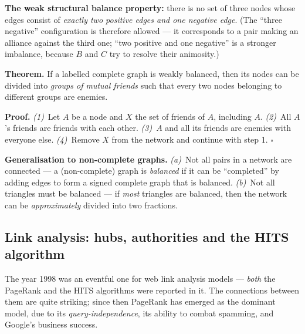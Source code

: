 \documentclass[11pt,a4paper]{article}
\theoremstyle{definition}
\providecommand{\uv}[1]{``#1''}
\begin{document}
\begin{defbox}
\textbf{The weak structural balance property:} there is no set of three nodes whose edges consist of
\emph{exactly two positive edges and one negative edge}. (The \uv{three negative} configuration is
therefore allowed --- it corresponds to a pair making an alliance against the third one; \uv{two
positive and one negative} is a stronger imbalance, because $B$ and $C$ try to resolve their
animosity.)

\textbf{Theorem.} If a labelled complete graph is weakly balanced, then its nodes can be divided into
\emph{groups of mutual friends} such that every two nodes belonging to different groups are enemies.

\textbf{Proof.} \emph{(1)}~Let $A$ be a node and $X$ the set of friends of $A$, including $A$.
\emph{(2)}~All $A$'s friends are friends with each other. \emph{(3)}~$A$ and all its friends are
enemies with everyone else. \emph{(4)}~Remove $X$ from the network and continue with step 1.
$\square$

\textbf{Generalisation to non-complete graphs.} \emph{(a)}~Not all pairs in a network are connected
--- a (non-complete) graph is \emph{balanced} if it can be \uv{completed} by adding edges to form a
signed complete graph that is balanced. \emph{(b)}~Not all triangles must be balanced --- if
\emph{most} triangles are balanced, then the network can be \emph{approximately} divided into two
fractions.
\end{defbox}

\subsection{Link analysis: hubs, authorities and the HITS algorithm}

The year 1998 was an eventful one for web link analysis models --- \emph{both} the PageRank and the
HITS algorithms were reported in it. The connections between them are quite striking; since then
PageRank has emerged as the dominant model, due to its \emph{query-independence}, its ability to
combat spamming, and Google's business success.
\end{document}
